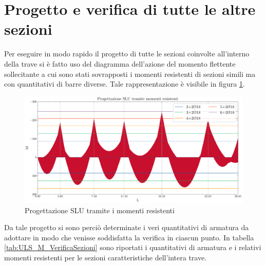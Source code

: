 \section{Progetto e verifica di tutte le altre sezioni}
Per eseguire in modo rapido il progetto di tutte le sezioni coinvolte all'interno della trave si è fatto uso del diagramma dell'azione del momento flettente sollecitante a cui sono stati sovrapposti i momenti resistenti di sezioni simili ma con quantitativi di barre diverse. 
Tale rappresentazione è visibile in figura \ref{fig:ULS_M_progettazioneTramiteMomentiResistenti}. 
\begin{figure}[htb]
  \centering
  \includegraphics[width=\textwidth]{IMG/ULS_M_progettazioneTramiteMomentiResistenti.pdf}
  \caption{Progettazione SLU tramite i momenti resistenti}
  \label{fig:ULS_M_progettazioneTramiteMomentiResistenti}
\end{figure}
Da tale progetto si sono perciò determinate i veri quantitativi di armatura da adottare in modo che venisse soddisfatta la verifica in ciascun punto.
In tabella \ref{tab:ULS_M_VerificaSezioni} sono riportati i quantitativi di armatura e i relativi momenti resistenti per le sezioni caratteristiche dell'intera trave.
%
